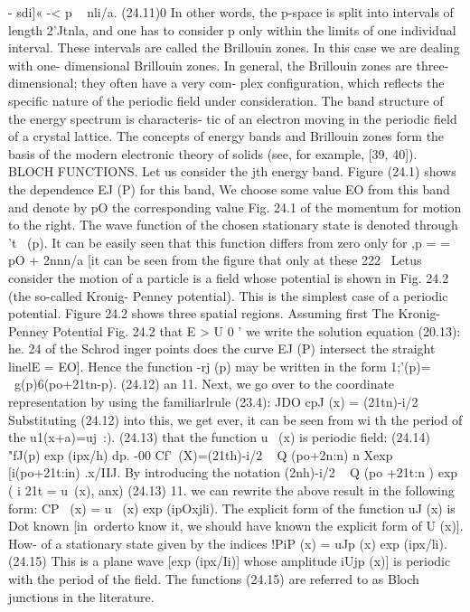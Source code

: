 \documentclass[a4paper,sfsidenotes,colorlinks=true]{tufte-book}
\numberwithin{equation}{section}
\numberwithin{figure}{section}
\begin{document}
{{{{{-	sdi]«	-< p	~	nli/a.	(24.11)0
In other words, the p-space is split into intervals of length 2'Jtnla, and one has to consider p only within the limits of one individual interval. These intervals are called the Brillouin zones. In this case we are dealing with one- dimensional Brillouin zones. In general, the Brillouin zones are three-dimensional; they often have a very com- plex configuration, which reflects the specific nature of the periodic field under consideration.
The band structure of the energy spectrum is characteris- tic of an electron moving in the periodic field of a crystal lattice. The concepts of energy bands and Brillouin zones form the basis of the modern electronic theory of solids (see, for example, [39, 40]).
BLOCH FUNCTIONS. Let us consider the jth energy band. Figure (24.1) shows the dependence EJ (P) for this band, We choose some value EO from this band and denote by pO the corresponding value
Fig. 24.1
of the momentum for motion to the right. The wave function of the chosen stationary state is denoted through 't~ (p). It can be
easily seen that this function differs from zero only for ,p = = pO + 2nnn/a [it can be seen from the figure that only at these
222
~Letus consider the motion of a particle is a field whose potential is shown in Fig. 24.2 (the so-called Kronig- Penney potential). This is the simplest case of a periodic potential.
Figure 24.2 shows three spatial regions. Assuming first
The Kronig-Penney Potential
Fig. 24.2
that	E	>	U 0 '	we	write	the	solution equation (20.13):
he. 24
of	the
Schrod inger
points does the curve EJ (P) intersect the straight linelE = EO]. Hence the function -rj (p) may be written in the form
1;'(p)= ~g(p)6(po+21tn-p).	(24.12) an
11.
Next, we go over to the coordinate representation by using the familiarlrule (23.4):
JDO
cpJ (x) =	(21tn)-i/2 Substituting (24.12) into this, we get
ever, it can be seen from wi th	the	period	of	the
u1(x+a)=uj~:).
(24.13) that the function u~ (x) is periodic field:
(24.14)
"fJ(p) exp (ipx/h) dp.
-00
Cf'~(X)=(21th)-i/2 ~ Q (po+2n:n) n
Xexp [i(po+21t:in) .x/IIJ. By introducing the notation
(2nh)-i/2 ~ Q (po +21t:n ) exp ( i 21t	= u~(x), anx)
(24.13)
11. we can rewrite the above result in the following form: CP~ (x) = u~ (x) exp (ipOxjli).
The explicit form of the function uJ (x) is Dot known [in~orderto know it, we should have known the explicit form of U (x)]. How-
of a stationary state given by the indices !PiP (x) = uJp (x) exp (ipx/li).	(24.15)
This is a plane wave [exp (ipx/Ii)] whose amplitude iUjp (x)] is periodic with the period of the field. The functions (24.15) are referred to as Bloch junctions in the literature.
}}}}}
\end{document}
